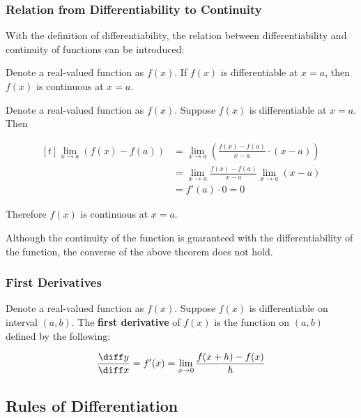 \subsubsection{Relation from Differentiability to Continuity}
With the definition of differentiability, the relation between differentiability and continuity of functions can be introduced:\n

\begin{thm}
  Denote a real-valued function as $f(x)$. If $f(x)$ is differentiable at $x=a$, then $f(x)$ is continuous at $x=a$.\n

  \prf Denote a real-valued function as $f(x)$. Suppose $f(x)$ is differentiable at $x=a$. Then

  $$\begin{aligned}[t]
    \lim_{x\to a}(f(x)-f(a))&=\lim_{x\to a}(\frac{f(x)-f(a)}{x-a}\cdot (x-a))\\
    &=\lim_{x\to a}\frac{f(x)-f(a)}{x-a}\lim_{x\to a}(x-a)\\
    &=f'(a)\cdot 0=0
  \end{aligned}$$\s

  Therefore $f(x)$ is continuous at $x=a$.
\end{thm}\n

Although the continuity of the function is guaranteed with the differentiability of the function, the converse of the above theorem does not hold.

\subsubsection{First Derivatives}
\begin{dft}
  Denote a real-valued function as $f(x)$. Suppose $f(x)$ is differentiable on interval $(a,b)$. The \textbf{first derivative} of $f(x)$ is the function on $(a,b)$ defined by the following:

  $$\frac{\diff  y}{\diff  x}=f'(x)=\lim_{x\to 0}\frac{f(x+h)-f(x)}{h}$$
\end{dft}

\subsection{Rules of Differentiation}
